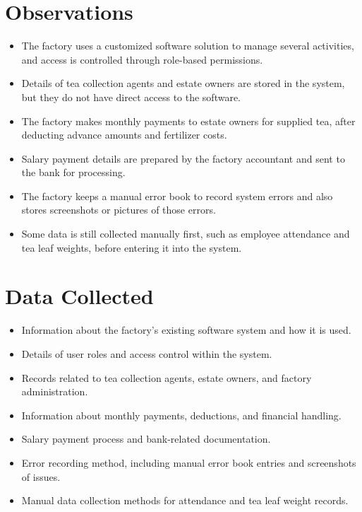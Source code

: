 \documentclass[11pt,a4paper]{article}
\begin{document}
\section*{Observations}
\begin{itemize}[nosep]
    \item The factory uses a customized software solution to manage several activities, and access is controlled through role-based permissions.
    \item Details of tea collection agents and estate owners are stored in the system, but they do not have direct access to the software.
    \item The factory makes monthly payments to estate owners for supplied tea, after deducting advance amounts and fertilizer costs.
    \item Salary payment details are prepared by the factory accountant and sent to the bank for processing.
    \item The factory keeps a manual error book to record system errors and also stores screenshots or pictures of those errors.
    \item Some data is still collected manually first, such as employee attendance and tea leaf weights, before entering it into the system.
\end{itemize}

\section*{Data Collected}
\begin{itemize}[nosep]
    \item Information about the factory's existing software system and how it is used.
    \item Details of user roles and access control within the system.
    \item Records related to tea collection agents, estate owners, and factory administration.
    \item Information about monthly payments, deductions, and financial handling.
    \item Salary payment process and bank-related documentation.
    \item Error recording method, including manual error book entries and screenshots of issues.
    \item Manual data collection methods for attendance and tea leaf weight records.
\end{itemize}
\end{document}
